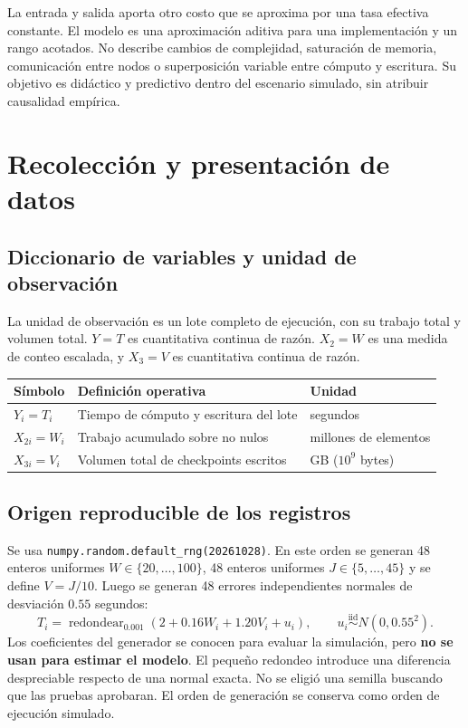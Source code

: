 \documentclass[11pt,a4paper]{article}
\begin{document}
La entrada y salida aporta otro costo que se aproxima por una tasa efectiva constante. El modelo es una aproximación aditiva para una implementación y un rango acotados. No describe cambios de complejidad, saturación de memoria, comunicación entre nodos o superposición variable entre cómputo y escritura. Su objetivo es didáctico y predictivo dentro del escenario simulado, sin atribuir causalidad empírica.

\section{Recolección y presentación de datos}
\subsection{Diccionario de variables y unidad de observación}
La unidad de observación es un lote completo de ejecución, con su trabajo total y volumen total. $Y=T$ es cuantitativa continua de razón. $X_2=W$ es una medida de conteo escalada, y $X_3=V$ es cuantitativa continua de razón.
\begin{center}
\begin{tabular}{p{1.8cm}p{7.3cm}p{3.2cm}}\toprule
Símbolo & Definición operativa & Unidad\\\midrule
$Y_i=T_i$ & Tiempo de cómputo y escritura del lote & segundos\\
$X_{2i}=W_i$ & Trabajo acumulado sobre no nulos & millones de elementos\\
$X_{3i}=V_i$ & Volumen total de checkpoints escritos & GB ($10^9$ bytes)\\\bottomrule
\end{tabular}
\end{center}

\subsection{Origen reproducible de los registros}
Se usa \texttt{numpy.random.default\_rng(20261028)}. En este orden se generan 48 enteros uniformes $W\in\{20,\ldots,100\}$, 48 enteros uniformes $J\in\{5,\ldots,45\}$ y se define $V=J/10$. Luego se generan 48 errores independientes normales de desviación $0.55$ segundos:
\[
T_i=\operatorname{redondear}_{0.001}\left(2+0.16W_i+1.20V_i+u_i\right),
\qquad u_i\overset{\mathrm{iid}}\sim N(0,0.55^2).
\]
Los coeficientes del generador se conocen para evaluar la simulación, pero \textbf{no se usan para estimar el modelo}. El pequeño redondeo introduce una diferencia despreciable respecto de una normal exacta. No se eligió una semilla buscando que las pruebas aprobaran. El orden de generación se conserva como orden de ejecución simulado.
\end{document}
